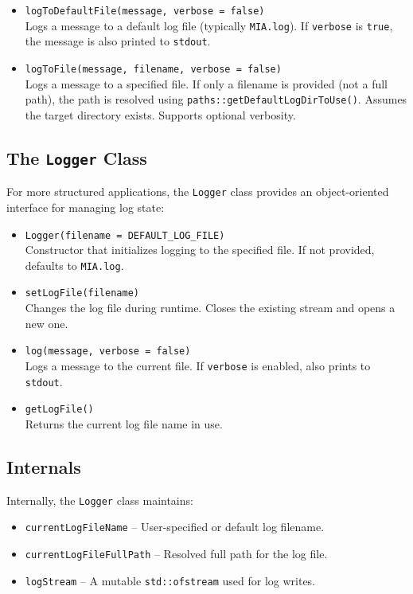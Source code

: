 \begin{itemize}
	\item \texttt{logToDefaultFile(message, verbose = false)}\\
	Logs a message to a default log file (typically \texttt{MIA.log}). If \texttt{verbose} is \texttt{true}, the message is also printed to \texttt{stdout}.
	
	\item \texttt{logToFile(message, filename, verbose = false)}\\
	Logs a message to a specified file. If only a filename is provided (not a full path), the path is resolved using \texttt{paths::getDefaultLogDirToUse()}. Assumes the target directory exists. Supports optional verbosity.
\end{itemize}

\subsection{The \texttt{Logger} Class}
For more structured applications, the \texttt{Logger} class provides an object-oriented interface for managing log state:

\begin{itemize}
	\item \texttt{Logger(filename = DEFAULT\_LOG\_FILE)}\\
	Constructor that initializes logging to the specified file. If not provided, defaults to \texttt{MIA.log}.
	
	\item \texttt{setLogFile(filename)}\\
	Changes the log file during runtime. Closes the existing stream and opens a new one.
	
	\item \texttt{log(message, verbose = false)}\\
	Logs a message to the current file. If \texttt{verbose} is enabled, also prints to \texttt{stdout}.
	
	\item \texttt{getLogFile()}\\
	Returns the current log file name in use.
\end{itemize}

\subsection{Internals}
Internally, the \texttt{Logger} class maintains:

\begin{itemize}
	\item \texttt{currentLogFileName} -- User-specified or default log filename.
	\item \texttt{currentLogFileFullPath} -- Resolved full path for the log file.
	\item \texttt{logStream} -- A mutable \texttt{std::ofstream} used for log writes.
\end{itemize}

